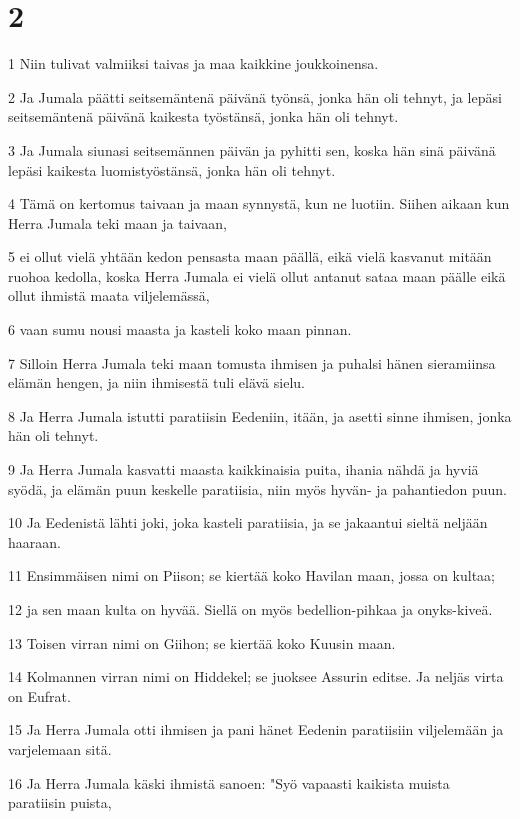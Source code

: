 \chapter{2}

\par 1 Niin tulivat valmiiksi taivas ja maa kaikkine joukkoinensa.
\par 2 Ja Jumala päätti seitsemäntenä päivänä työnsä, jonka hän oli tehnyt, ja lepäsi seitsemäntenä päivänä kaikesta työstänsä, jonka hän oli tehnyt.
\par 3 Ja Jumala siunasi seitsemännen päivän ja pyhitti sen, koska hän sinä päivänä lepäsi kaikesta luomistyöstänsä, jonka hän oli tehnyt.
\par 4 Tämä on kertomus taivaan ja maan synnystä, kun ne luotiin. Siihen aikaan kun Herra Jumala teki maan ja taivaan,
\par 5 ei ollut vielä yhtään kedon pensasta maan päällä, eikä vielä kasvanut mitään ruohoa kedolla, koska Herra Jumala ei vielä ollut antanut sataa maan päälle eikä ollut ihmistä maata viljelemässä,
\par 6 vaan sumu nousi maasta ja kasteli koko maan pinnan.
\par 7 Silloin Herra Jumala teki maan tomusta ihmisen ja puhalsi hänen sieramiinsa elämän hengen, ja niin ihmisestä tuli elävä sielu.
\par 8 Ja Herra Jumala istutti paratiisin Eedeniin, itään, ja asetti sinne ihmisen, jonka hän oli tehnyt.
\par 9 Ja Herra Jumala kasvatti maasta kaikkinaisia puita, ihania nähdä ja hyviä syödä, ja elämän puun keskelle paratiisia, niin myös hyvän- ja pahantiedon puun.
\par 10 Ja Eedenistä lähti joki, joka kasteli paratiisia, ja se jakaantui sieltä neljään haaraan.
\par 11 Ensimmäisen nimi on Piison; se kiertää koko Havilan maan, jossa on kultaa;
\par 12 ja sen maan kulta on hyvää. Siellä on myös bedellion-pihkaa ja onyks-kiveä.
\par 13 Toisen virran nimi on Giihon; se kiertää koko Kuusin maan.
\par 14 Kolmannen virran nimi on Hiddekel; se juoksee Assurin editse. Ja neljäs virta on Eufrat.
\par 15 Ja Herra Jumala otti ihmisen ja pani hänet Eedenin paratiisiin viljelemään ja varjelemaan sitä.
\par 16 Ja Herra Jumala käski ihmistä sanoen: "Syö vapaasti kaikista muista paratiisin puista,
